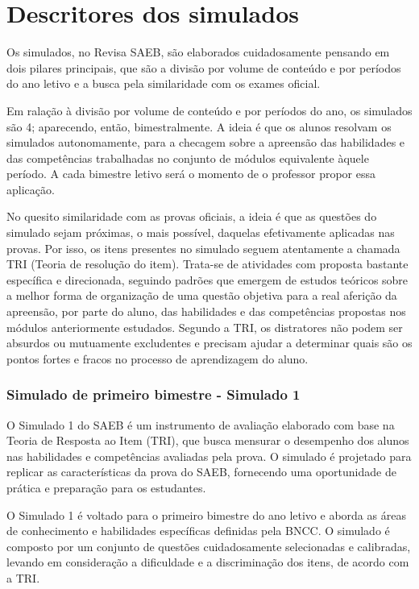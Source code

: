 \section{Descritores dos simulados}

Os simulados, no Revisa SAEB, são elaborados cuidadosamente pensando em
dois pilares principais, que são a divisão por volume de conteúdo e por
períodos do ano letivo e a busca pela similaridade com os exames
oficial.

Em ralação à divisão por volume de conteúdo e por períodos do ano, os
simulados são 4; aparecendo, então, bimestralmente. A ideia é que os
alunos resolvam os simulados autonomamente, para a checagem sobre a
apreensão das habilidades e das competências trabalhadas no conjunto de
módulos equivalente àquele período. A cada bimestre letivo será o
momento de o professor propor essa aplicação.

No quesito similaridade com as provas oficiais, a ideia é que as
questões do simulado sejam próximas, o mais possível, daquelas
efetivamente aplicadas nas provas. Por isso, os itens presentes no
simulado seguem atentamente a chamada TRI (Teoria de resolução do item).
Trata-se de atividades com proposta bastante específica e direcionada,
seguindo padrões que emergem de estudos teóricos sobre a melhor forma de
organização de uma questão objetiva para a real aferição da apreensão,
por parte do aluno, das habilidades e das competências propostas nos
módulos anteriormente estudados. Segundo a TRI, os distratores não podem
ser absurdos ou mutuamente excludentes e precisam ajudar a determinar
quais são os pontos fortes e fracos no processo de aprendizagem do
aluno.

\subsubsection{Simulado de primeiro bimestre - Simulado
1}\label{simulado-de-primeiro-bimestre---simulado-1}

O Simulado 1 do SAEB é um instrumento de avaliação elaborado com base na
Teoria de Resposta ao Item (TRI), que busca mensurar o desempenho dos
alunos nas habilidades e competências avaliadas pela prova. O simulado é
projetado para replicar as características da prova do SAEB, fornecendo
uma oportunidade de prática e preparação para os estudantes.

O Simulado 1 é voltado para o primeiro bimestre do ano letivo e aborda
as áreas de conhecimento e habilidades específicas definidas pela BNCC.
O simulado é composto por um conjunto de questões cuidadosamente
selecionadas e calibradas, levando em consideração a dificuldade e a
discriminação dos itens, de acordo com a TRI.

